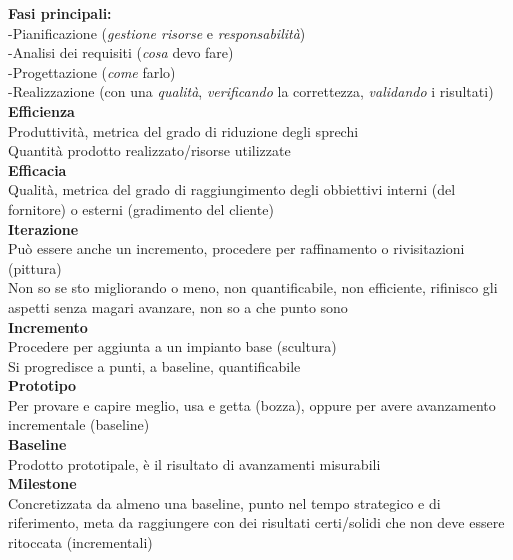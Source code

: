\documentclass{article}
\begin{document}
		\textbf{Fasi principali:}\\
		-Pianificazione (\textit{gestione risorse} e \textit{responsabilità})\\
		-Analisi dei requisiti (\textsl{cosa} devo fare)\\
		-Progettazione (\textit{come} farlo)\\
		-Realizzazione (con una \textit{qualità}, \textit{verificando} la correttezza, \textit{validando} i risultati)\\
		
		\textbf{Efficienza}\\
		Produttività, metrica del grado di riduzione degli sprechi\\
		Quantità prodotto realizzato/risorse utilizzate\\
		
		\textbf{Efficacia}\\
		Qualità, metrica del grado di raggiungimento degli obbiettivi interni (del fornitore) o esterni (gradimento del cliente)\\
		
		\textbf{Iterazione}\\
		Può essere anche un incremento, procedere per raffinamento o rivisitazioni (pittura)\\
		Non so se sto migliorando o meno, non quantificabile, non efficiente, rifinisco gli aspetti senza magari avanzare, non so a che punto sono\\
		
		\textbf{Incremento}\\
		Procedere per aggiunta a un impianto base (scultura)\\
		Si progredisce a punti, a baseline, quantificabile\\
		
		\textbf{Prototipo}\\
		Per provare e capire meglio, usa e getta (bozza), oppure per avere avanzamento incrementale (baseline)\\
					
		\textbf{Baseline}\\
		Prodotto prototipale, è il risultato di avanzamenti misurabili\\
		
		\textbf{Milestone}\\
		Concretizzata da almeno una baseline, punto nel tempo strategico e di riferimento, meta da raggiungere con dei risultati certi/solidi che non deve essere ritoccata (incrementali)\\
		
\end{document}
